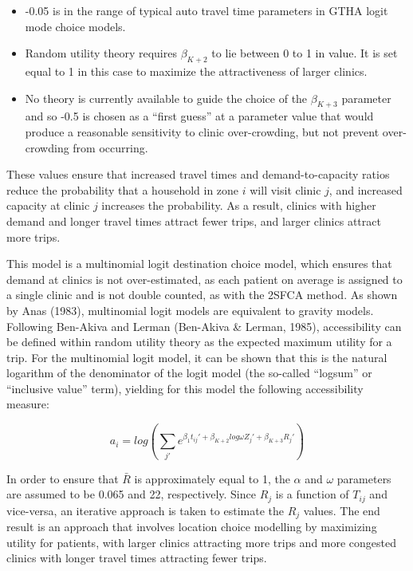 \documentclass{article}
\begin{document}
\begin{itemize}
\item
  -0.05 is in the range of typical auto travel time parameters in GTHA
  logit mode choice models.
\item
  Random utility theory requires \(\beta_{K+2}\) to lie between 0 to 1
  in value. It is set equal to 1 in this case to maximize the
  attractiveness of larger clinics.
\item
  No theory is currently available to guide the choice of the
  \(\beta_{K+3}\) parameter and so -0.5 is chosen as a ``first guess''
  at a parameter value that would produce a reasonable sensitivity to
  clinic over-crowding, but not prevent over-crowding from occurring.
\end{itemize}

These values ensure that increased travel times and demand-to-capacity
ratios reduce the probability that a household in zone \(i\) will visit
clinic \(j\), and increased capacity at clinic \(j\) increases the
probability. As a result, clinics with higher demand and longer travel
times attract fewer trips, and larger clinics attract more trips.

This model is a multinomial logit destination choice model, which
ensures that demand at clinics is not over-estimated, as each patient on
average is assigned to a single clinic and is not double counted, as
with the 2SFCA method. As shown by Anas (1983), multinomial logit models
are equivalent to gravity models. Following Ben-Akiva and Lerman
(Ben-Akiva \& Lerman, 1985), accessibility can be defined within random
utility theory as the expected maximum utility for a trip. For the
multinomial logit model, it can be shown that this is the natural
logarithm of the denominator of the logit model (the so-called
``logsum'' or ``inclusive value'' term), yielding for this model the
following accessibility measure:

\[
a_i = log(\sum_{j\prime} e^{\beta_1 t_{ij}\prime + \beta_{K+2} log \omega Z_j\prime + \beta_{K + 3} R_j\prime})
\]

In order to ensure that \(\bar{R}\) is approximately equal to 1, the
\(\alpha\) and \(\omega\) parameters are assumed to be 0.065 and 22,
respectively. Since \(R_j\) is a function of \(T_{ij}\) and vice-versa,
an iterative approach is taken to estimate the \(R_j\) values. The end
result is an approach that involves location choice modelling by
maximizing utility for patients, with larger clinics attracting more
trips and more congested clinics with longer travel times attracting
fewer trips.
\end{document}
